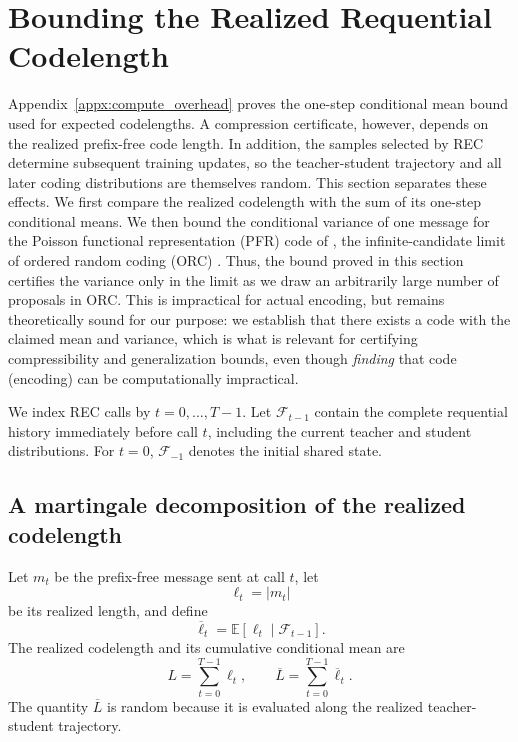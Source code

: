 \documentclass{article}
\theoremstyle{plain}
\theoremstyle{definition}
\theoremstyle{remark}
\begin{document}
\section{Bounding the Realized Requential Codelength}
\label{appx:realized-codelength}

Appendix~\ref{appx:compute_overhead} proves the one-step conditional mean bound used for expected codelengths. A compression certificate, however, depends on the realized prefix-free code length. In addition, the samples selected by REC determine subsequent training updates, so the teacher-student trajectory and all later coding distributions are themselves random. This section separates these effects. We first compare the realized codelength with the sum of its one-step conditional means. We then bound the conditional variance of one message for the Poisson functional representation (PFR) code of \citet{li2018strong}, the infinite-candidate limit of ordered random coding (ORC) \citep{theis2022algorithms}. Thus, the bound proved in this section certifies the variance only in the limit as we draw an arbitrarily large number of proposals in ORC. This is impractical for actual encoding, but remains theoretically sound for our purpose: we establish that there exists a code with the claimed mean and variance, which is what is relevant for certifying compressibility and generalization bounds, even though \emph{finding} that code (encoding) can be computationally impractical.

We index REC calls by $t=0,\ldots,T-1$. Let $\mathcal F_{t-1}$ contain the complete requential history immediately before call $t$, including the current teacher and student distributions. For $t=0$, $\mathcal F_{-1}$ denotes the initial shared state.

\subsection{A martingale decomposition of the realized codelength}

Let $m_t$ be the prefix-free message sent at call $t$, let
\begin{equation}
    \ell_t
    =
    |m_t|
\end{equation}
be its realized length, and define
\begin{equation}
    \overline\ell_t
    =
    \mathbb E[\ell_t\mid\mathcal F_{t-1}].
\end{equation}
The realized codelength and its cumulative conditional mean are
\begin{equation}
    L
    =
    \sum_{t=0}^{T-1}\ell_t,
    \qquad
    \overline L
    =
    \sum_{t=0}^{T-1}\overline\ell_t.
\end{equation}
The quantity $\overline L$ is random because it is evaluated along the realized teacher-student trajectory.
\end{document}
